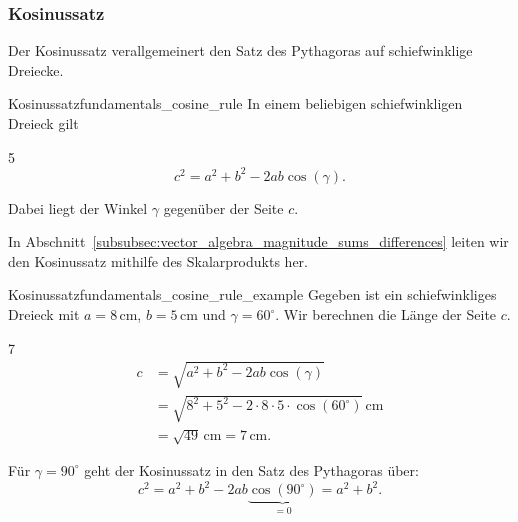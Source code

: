 \subsubsection{Kosinussatz}
\label{subsubsec:fundamentals_oblique_triangles_cosine_rule}

Der Kosinussatz verallgemeinert den Satz des Pythagoras auf schiefwinklige
Dreiecke.

\begin{TheoremBox}{Kosinussatz}{fundamentals_cosine_rule}
  In einem beliebigen schiefwinkligen Dreieck gilt
  \begin{ClozeArea}[20]{5}
    \[
      c^2=a^2+b^2-2ab\cos(\gamma).
    \]
  \end{ClozeArea}
  Dabei liegt der Winkel $\gamma$ gegenüber der Seite $c$.
\end{TheoremBox}
In Abschnitt~\ref{subsubsec:vector_algebra_magnitude_sums_differences} leiten wir
den Kosinussatz mithilfe des Skalarprodukts her.


\begin{ExampleBox}{Kosinussatz}{fundamentals_cosine_rule_example}
  Gegeben ist ein schiefwinkliges Dreieck mit $a=8\,\mathrm{cm}$,
  $b=5\,\mathrm{cm}$ und $\gamma=60^\circ$. Wir berechnen die Länge der
  Seite $c$.
  \par\smallskip
  \noindent
  \begin{minipage}[c]{0.60\linewidth}
    \begin{ClozeArea}[18]{7}
      \[
        \begin{aligned}
          c &=\sqrt{a^2+b^2-2ab\cos(\gamma)}\\
            &=\sqrt{8^2+5^2-2\cdot8\cdot5\cdot\cos(60^\circ)}\,\mathrm{cm}\\
            &=\sqrt{49}\,\mathrm{cm}=7\,\mathrm{cm}.
        \end{aligned}
      \]
    \end{ClozeArea}
  \end{minipage}\hfill
  \begin{minipage}[c]{0.36\linewidth}
    \centering
  \end{minipage}
\end{ExampleBox}

\begin{RemarkBox}[remark title=Pythagoras als Spezialfall des Kosinussatzes]
  Für $\gamma=90^\circ$ geht der Kosinussatz in den Satz des Pythagoras über:
  \[
    c^2=a^2+b^2-2ab\underbrace{\cos(90^\circ)}_{=0}=a^2+b^2.
  \]
\end{RemarkBox}
